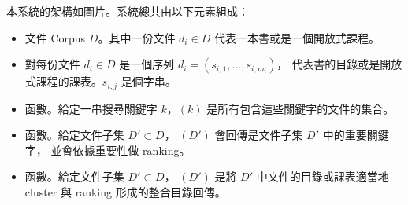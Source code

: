 本系統的架構如圖片。系統總共由以下元素組成：

\begin{itemize}
  \item 文件 Corpus $D$。其中一份文件 $d_i\in D$ 代表一本書或是一個開放式課程。
  \item 對每份文件 $d_i\in D$ 是一個序列 $d_i = (s_{i,1},\dots,s_{i,m_i})$，
        代表書的目錄或是開放式課程的課表。$s_{i,j}$ 是個字串。
  \item {} 函數。給定一串搜尋關鍵字 $k$，$(k)$
        是所有包含這些關鍵字的文件的集合。
  \item {} 函數。給定文件子集 $D'\subset D$，
        $(D')$ 會回傳是文件子集 $D'$ 中的重要關鍵字，
        並會依據重要性做 ranking。
  \item {} 函數。給定文件子集 $D'\subset D$，
        $(D')$ 是將 $D'$ 中文件的目錄或課表適當地 cluster
        與 ranking 形成的整合目錄回傳。
\end{itemize}
